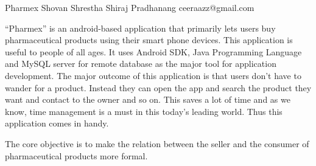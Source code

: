  \begin{conf-abstract}[]
 {Pharmex}
 {Shovan Shrestha
 	 Shiraj Pradhanang
 }
{ceeraazz@gmail.com}

“Pharmex” is an android-based application that primarily lets users buy pharmaceutical products using their smart phone devices. This application is useful to people of all ages. It uses Android SDK, Java Programming Language and MySQL server for remote database as the major tool for application development. The major outcome of this application is that users don’t have to wander for a product. Instead they can open the app and search the product they want and contact to the owner and so on. This saves a lot of time and as we know, time management is a must in this today’s leading world. Thus this application comes in handy.

The core objective is to make the relation between the seller and the consumer of pharmaceutical products  more formal.
 \end{conf-abstract}
